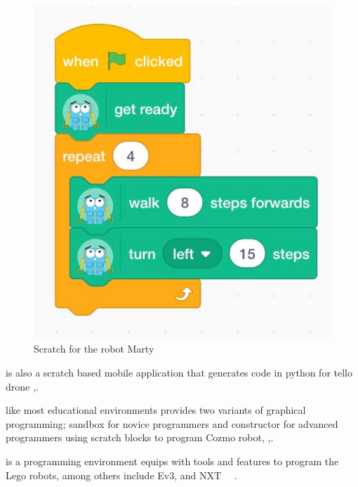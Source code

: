 \begin{figure}[t]
     \centering
    \includegraphics[width=.6\columnwidth]{ScratchMarty.jpg}
      \caption{Scratch for the robot Marty\,\cite{Marty} }
      \label{scratch-marty}
   \end{figure}

\parhead{\tello} is also a scratch based mobile application that generates code in python for tello drone %
,\cite{TelloEduApp}.

\parhead{\codelab} like most educational environments provides two variants of graphical programming; sandbox for novice programmers and constructor for advanced programmers using scratch blocks to program Cozmo robot,
,\cite{COZMO}.  %

\parhead{\lego} is a programming environment equips with tools and features to program the Lego robots, among others include Ev3, and NXT %
\, ~\cite{LEGO,alternativeLEGO}. %

